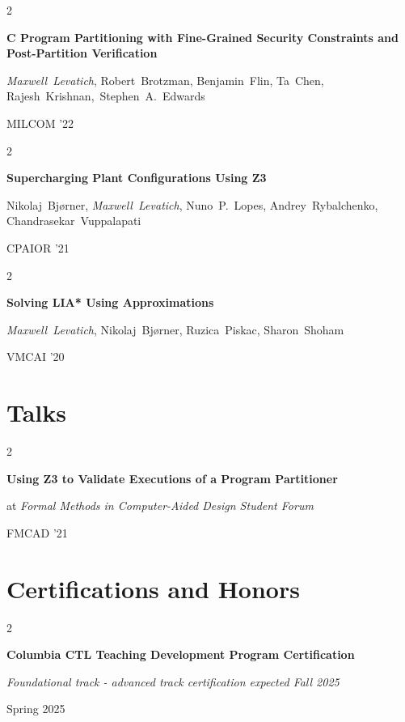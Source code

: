 \documentclass[10pt, letterpaper]{article}
\newenvironment{twocolentry}[2][]{
    \onecolentry
    \def\secondColumn{#2}
    \setcolumnwidth{\fill, 5.5 cm}
    \begin{paracol}{2}
}{
    \switchcolumn \raggedleft \secondColumn
    \end{paracol}
    \endonecolentry
} %
\begin{document}
        \vspace{0.4 cm}
        
        \begin{twocolentry}{MILCOM '22}
            \textbf{C Program Partitioning with Fine-Grained Security Constraints and Post-Partition Verification}

            \mbox{{\textit{Maxwell Levatich}}}, \mbox{Robert Brotzman}, \mbox{Benjamin Flin}, \mbox{Ta Chen}, \mbox{Rajesh Krishnan, Stephen A. Edwards}
        \end{twocolentry}

        \begin{twocolentry}{CPAIOR '21}
            \textbf{Supercharging Plant Configurations Using Z3}

            \mbox{Nikolaj Bjørner}, \mbox{{\textit{Maxwell Levatich}}}, \mbox{Nuno P. Lopes}, \mbox{Andrey Rybalchenko}, \mbox{Chandrasekar Vuppalapati}
        \end{twocolentry}

        \begin{twocolentry}{VMCAI '20}
            \textbf{Solving LIA* Using Approximations}

            \mbox{{\textit{Maxwell Levatich}}}, \mbox{Nikolaj Bjørner}, \mbox{Ruzica Piskac}, \mbox{Sharon Shoham}
        \end{twocolentry}

    \section{Talks}
        
        \begin{twocolentry}{FMCAD '21}
            \textbf{Using Z3 to Validate Executions of a Program Partitioner}

            at \textit{Formal Methods in Computer-Aided Design Student Forum}
        \end{twocolentry}

    \section{Certifications and Honors}
        
        \begin{twocolentry}{Spring 2025}
            \textbf{Columbia CTL Teaching Development Program Certification}

            \textit{Foundational track - advanced track certification expected Fall 2025}
        \end{twocolentry}
\end{document}
